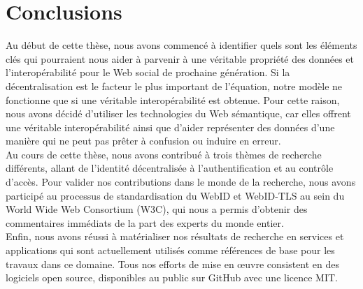 \section*{Conclusions}
Au début de cette thèse, nous avons commencé à identifier quels sont les éléments clés qui pourraient nous aider à parvenir à une véritable propriété des données et l'interopérabilité pour le Web social de prochaine génération. Si la décentralisation est le facteur le plus important de l'équation, notre modèle ne fonctionne que si une véritable interopérabilité est obtenue. Pour cette raison, nous avons décidé d'utiliser les technologies du Web sémantique, car elles offrent une véritable interopérabilité ainsi que d'aider représenter des données d'une manière qui ne peut pas prêter à confusion ou induire en erreur.\\


Au cours de cette thèse, nous avons contribué à trois thèmes de recherche différents, allant de l'identité décentralisée  à l'authentification et au contrôle d'accès. Pour valider nos contributions dans le monde de la recherche, nous avons participé au processus de standardisation du WebID et WebID-TLS au sein du World Wide Web Consortium (W3C), qui nous a permis d'obtenir des commentaires immédiats de la part des experts du monde entier.\\


Enfin, nous avons réussi à matérialiser nos résultats de recherche en services et applications qui sont actuellement utilisés comme références de base pour les travaux dans ce domaine. Tous nos efforts de mise en œuvre consistent en des logiciels open source, disponibles au public sur GitHub avec une licence MIT.

\clearpage
